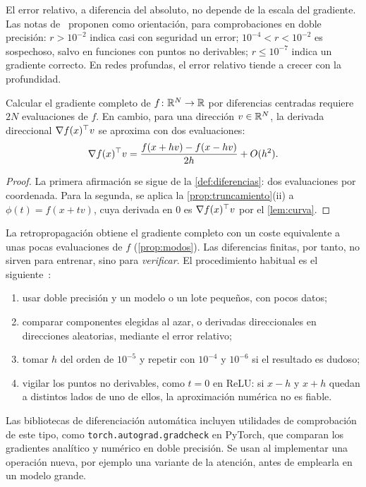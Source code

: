 El error relativo, a diferencia del absoluto, no depende de la escala del gradiente. Las notas de~\cite{cs231n} proponen como orientación, para comprobaciones en doble precisión: $r>10^{-2}$ indica casi con seguridad un error; $10^{-4}<r<10^{-2}$ es sospechoso, salvo en funciones con puntos no derivables; $r\le 10^{-7}$ indica un gradiente correcto. En redes profundas, el error relativo tiende a crecer con la profundidad.

\begin{proposicion}\label{prop:coste-fd}
Calcular el gradiente completo de $f\colon\mathbb{R}^{N}\to\mathbb{R}$ por diferencias centradas requiere $2N$ evaluaciones de $f$. En cambio, para una dirección $v\in\mathbb{R}^{N}$, la derivada direccional $\nabla f(x)^{\top} v$ se aproxima con dos evaluaciones:
\[
\nabla f(x)^{\top} v=\frac{f(x+hv)-f(x-hv)}{2h}+O(h^{2}).
\]
\end{proposicion}

\begin{proof}
La primera afirmación se sigue de la \cref{def:diferencias}: dos evaluaciones por coordenada. Para la segunda, se aplica la \cref{prop:truncamiento}(ii) a $\phi(t)=f(x+tv)$, cuya derivada en $0$ es $\nabla f(x)^{\top} v$ por el \cref{lem:curva}.
\end{proof}

La retropropagación obtiene el gradiente completo con un coste equivalente a unas pocas evaluaciones de $f$ (\cref{prop:modos}). Las diferencias finitas, por tanto, no sirven para entrenar, sino para \emph{verificar}. El procedimiento habitual es el siguiente~\cite{cs231n}:
\begin{enumerate}[label=\arabic*.]
  \item usar doble precisión y un modelo o un lote pequeños, con pocos datos;
  \item comparar componentes elegidas al azar, o derivadas direccionales en direcciones aleatorias, mediante el error relativo;
  \item tomar $h$ del orden de $10^{-5}$ y repetir con $10^{-4}$ y $10^{-6}$ si el resultado es dudoso;
  \item vigilar los puntos no derivables, como $t=0$ en ReLU: si $x-h$ y $x+h$ quedan a distintos lados de uno de ellos, la aproximación numérica no es fiable.
\end{enumerate}

\begin{observacion}
Las bibliotecas de diferenciación automática incluyen utilidades de comprobación de este tipo, como \texttt{torch.autograd.gradcheck} en PyTorch, que comparan los gradientes analítico y numérico en doble precisión. Se usan al implementar una operación nueva, por ejemplo una variante de la atención, antes de emplearla en un modelo grande.
\end{observacion}

